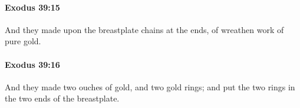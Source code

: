 		\paragraph{Exodus 39:15} %
			\label{EXODUS-39-15}

			And they made upon the breastplate chains at the ends, of wreathen work of pure gold.


		\paragraph{Exodus 39:16} %
			\label{EXODUS-39-16}

			And they made two ouches of gold, and two gold rings; and put the two rings in the two ends of the breastplate.


